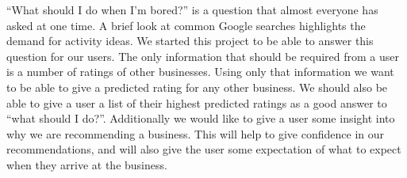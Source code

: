``What should I do when I'm bored?''  is a question that almost everyone has
asked at one time. A brief look at common Google searches highlights the demand
for activity ideas. We started this project to be able to answer this question
for our users. The only information that should be required from a user is 
a number of ratings of other businesses. Using only that information we want to
be able to give a predicted rating for any other business. We should also be
able to give a user a list of their highest predicted ratings as a good answer
to ``what should I do?''. Additionally we would like to give a user some insight
into why we are recommending a business. This will help to give confidence in
our recommendations, and will also give the user some expectation of what to
expect when they arrive at the business.

